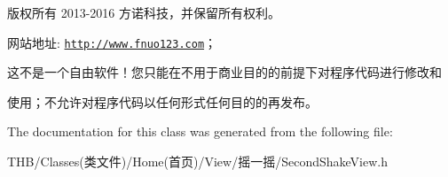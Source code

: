 版权所有 2013-\/2016 方诺科技，并保留所有权利。

网站地址\+: \href{http://www.fnuo123.com}{\tt http\+://www.\+fnuo123.\+com}； 



这不是一个自由软件！您只能在不用于商业目的的前提下对程序代码进行修改和

使用；不允许对程序代码以任何形式任何目的的再发布。 

 

The documentation for this class was generated from the following file\+:\begin{DoxyCompactItemize}
\item 
T\+H\+B/\+Classes(类文件)/\+Home(首页)/\+View/摇一摇/Second\+Shake\+View.\+h\end{DoxyCompactItemize}
